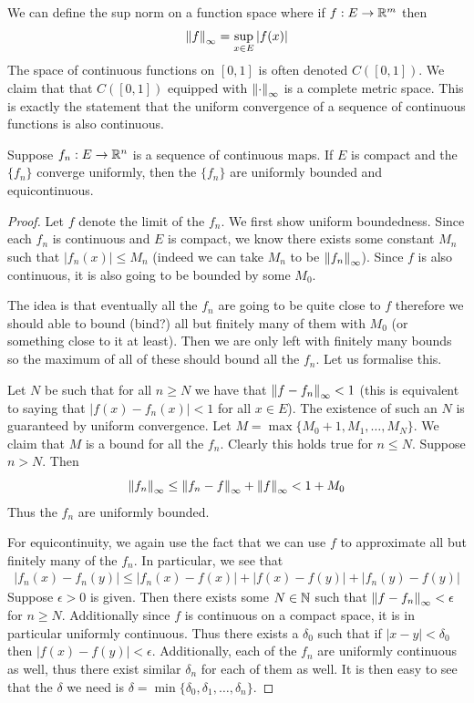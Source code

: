We can define the sup norm on a function space where if $f: E \to \mathbb{R}^m$ then
$$ \left\lVert f\right\rVert_\infty = \sup_{x \in E} |f(x)| $$
The space of continuous functions on $[0, 1]$ is often denoted $C([0, 1])$. We claim that that $C([0, 1])$ equipped with $\left\lVert\cdot\right\rVert_{\infty}$ is a complete metric space. This is exactly the statement that the uniform convergence of a sequence of continuous functions is also continuous.

\begin{theorem}
    Suppose $f_n: E \to \mathbb{R}^n$  is a sequence of continuous maps. If $E$ is compact and the $\{f_n\}$ converge uniformly, then the $\{f_n\}$ are uniformly bounded and equicontinuous.
\end{theorem}
\begin{proof}
Let $f$ denote the limit of the $f_n$. We first show uniform boundedness. Since each $f_n$ is continuous and $E$ is compact, we know there exists some constant $M_n$ such that $\left|f_n(x)\right| \leq M_n$ (indeed we can take $M_n$ to be $\left\lVert f_n\right\rVert_{\infty}$). Since $f$ is also continuous, it is also going to be bounded by some $M_0$.

The idea is that eventually all the $f_n$ are going to be quite close to $f$ therefore we should able to bound (bind?) all but finitely many of them with $M_0$ (or something close to it at least). Then we are only left with finitely many bounds so the maximum of all of these should bound all the $f_n$. Let us formalise this.

Let $N$ be such that for all $n \geq N$ we have that $\left\lVert f - f_n\right\rVert_{\infty} < 1$ (this is equivalent to saying that $\left|f(x) - f_n(x)\right| < 1$ for all $x \in E$). The existence of such an $N$ is guaranteed by uniform convergence. Let $M = \max\{M_0 + 1, M_1, \dots, M_{N}\}$. We claim that $M$ is a bound for all the $f_n$. Clearly this holds true for $n \leq N$. Suppose $n > N$. Then
$$ \left\lVert f_n\right\rVert_{\infty} \leq \left\lVert f_n - f\right\rVert_{\infty} + \left\lVert f\right\rVert_{\infty} < 1 + M_0 $$
Thus the $f_n$ are uniformly bounded.

For equicontinuity, we again use the fact that we can use $f$ to approximate all but finitely many of the $f_n$. In particular, we see that
\begin{align*}
    \left|f_n(x) - f_n(y)\right| \leq \left|f_n(x) - f(x)\right| + \left|f(x) - f(y)\right| + \left|f_n(y) - f(y)\right|
\end{align*}
Suppose $\epsilon > 0$ is given. Then there exists some $N \in \mathbb{N}$ such that $\left\lVert f - f_n\right\rVert_{\infty} < \epsilon$ for $n \geq N$. Additionally since $f$ is continuous on a compact space, it is in particular uniformly continuous. Thus there exists a $\delta_0$ such that if $\left|x - y\right| < \delta_0$ then $\left|f(x) - f(y)\right| < \epsilon$. Additionally, each of the $f_n$ are uniformly continuous as well, thus there exist similar $\delta_n$ for each of them as well. It is then easy to see that the $\delta$ we need is $\delta = \min\{\delta_0, \delta_1, \dots, \delta_n\}$.
\end{proof}


